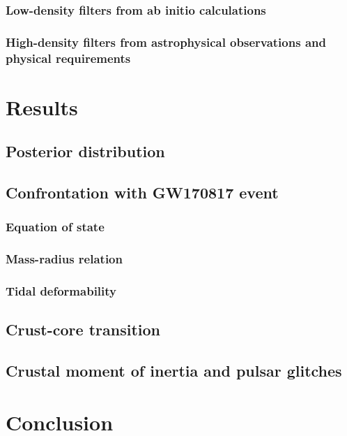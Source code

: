 \subsubsection{Low-density filters from ab initio calculations}

\subsubsection{High-density filters from astrophysical observations and 
physical requirements}

\section{Results}

\subsection{Posterior distribution}

\subsection{Confrontation with GW170817 event}

\subsubsection{Equation of state}

\subsubsection{Mass-radius relation}

\subsubsection{Tidal deformability}

\subsection{Crust-core transition}

\subsection{Crustal moment of inertia and pulsar glitches}

\section{Conclusion}
